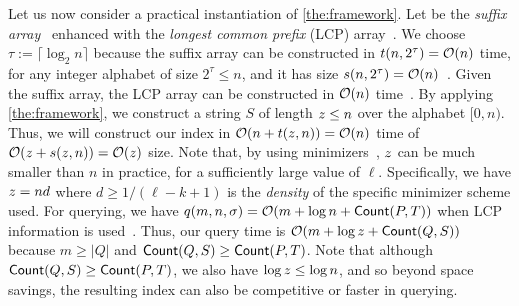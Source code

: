 Let us now consider a practical instantiation of \cref{the:framework}. Let \INDEX be the \emph{suffix
array}~\cite{DBLP:journals/siamcomp/ManberM93} enhanced with the \emph{longest
common prefix} (LCP) array~\cite{DBLP:conf/cpm/KasaiLAAP01}. We choose
$\tau:=\lceil\log_2 n\rceil$ because the suffix array can be constructed in $t(n,2^\tau)=\mathcal{O}(n)$ time, for any integer alphabet of size $2^\tau\leq n$,  and it has size $s(n,2^\tau)=\mathcal{O}(n)$~\cite{DBLP:journals/jacm/KarkkainenSB06}.
Given the suffix array, the LCP array can be constructed in $\mathcal{O}(n)$ time~\cite{DBLP:conf/cpm/KasaiLAAP01}.
By applying \cref{the:framework}, we construct a string $S$ of length $z\leq n$
over the alphabet $[0,n)$. Thus, we will construct our index in
  $\mathcal{O}(n+t(z,n))=\mathcal{O}(n)$ time of $\mathcal{O}(z+s(z,n))=\mathcal{O}(z)$ size. Note that, by
  using minimizers~\cite{DBLP:journals/bioinformatics/RobertsHHMY04,DBLP:conf/sigmod/SchleimerWA03}, $z$ can be much smaller
than $n$ in practice, for a sufficiently large value of $\ell$. Specifically, we have $z = nd$ where $d \geq 1/(\ell-k+1)$ is the \textit{density} of the specific minimizer scheme used.
For querying, we have $q(m,n,\sigma)=\mathcal{O}(m+\log n + \textup{\textsf{Count}}(P,T))$ when LCP information is used~\cite{DBLP:journals/siamcomp/ManberM93}.
Thus, our query time is $\mathcal{O}(m+\log z+\textup{\textsf{Count}}(Q,S))$
because $m\geq |Q|$ and $\textup{\textsf{Count}}(Q,S)\geq \textup{\textsf{Count}}(P,T)$. Note that although $\textup{\textsf{Count}}(Q,S)\geq \textup{\textsf{Count}}(P,T)$, we also have $\log z \leq \log n$, and so beyond space savings, the resulting index can also be competitive or faster in querying.
